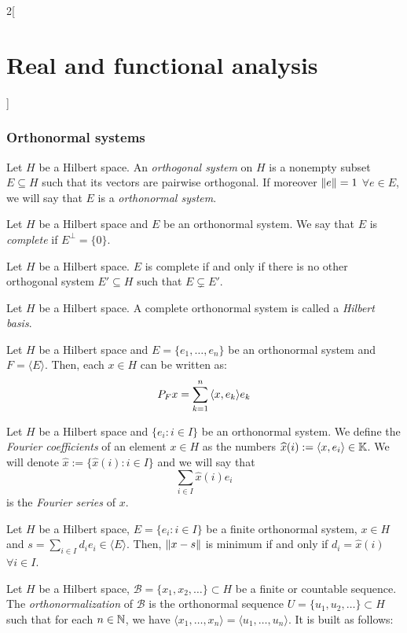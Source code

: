 \documentclass[../../../main_math.tex]{subfiles}
\begin{document}
\begin{multicols}{2}[\section{Real and functional analysis}]
  \subsubsection{Orthonormal systems}
  \begin{definition}
    Let $H$ be a Hilbert space. An \emph{orthogonal system} on $H$ is a nonempty subset $E\subseteq H$ such that its vectors are pairwise orthogonal. If moreover $\left\|e\right\|=1 $ $\forall e\in E$, we will say that $E$ is a \emph{orthonormal system}.
  \end{definition}
  \begin{definition}
    Let $H$ be a Hilbert space and $E$ be an orthonormal system. We say that $E$ is \emph{complete} if $E^\perp =\{0\}$.
  \end{definition}
  \begin{lemma}
    Let $H$ be a Hilbert space. $E$ is complete if and only if there is no other orthogonal system $E'\subseteq H$ such that $E\subsetneq E'$.
  \end{lemma}
  \begin{definition}
    Let $H$ be a Hilbert space. A complete orthonormal system is called a \emph{Hilbert basis}.
  \end{definition}
  \begin{lemma}
    Let $H$ be a Hilbert space and $E=\{e_1,\ldots,e_n\}$ be an orthonormal system and $F=\langle E\rangle$. Then, each $x\in H$ can be written as: $$P_Fx=\sum_{k=1}^n{\left\langle x,e_k\right\rangle}e_k$$
  \end{lemma}
  \begin{definition}
    Let $H$ be a Hilbert space and $\{e_i:i\in I\}$ be an orthonormal system. We define the \emph{Fourier coefficients} of an element $x\in H$ as the numbers $\widehat{x}(i):={\left\langle x,e_i\right\rangle}\in\mathbb{K}$. We will denote $\widehat{x}:=\{\widehat{x}(i):i\in I\}$ and we will say that $$\sum_{i\in I}\widehat{x}(i)e_i$$ is the \emph{Fourier series} of $x$.
  \end{definition}
  \begin{proposition}
    Let $H$ be a Hilbert space, $E=\{e_i:i\in I\}$ be a finite orthonormal system, $x\in H$ and $s=\sum_{i\in I}d_ie_i\in\langle E\rangle$. Then, $\left\|x-s\right\|$ is minimum if and only if $d_i=\widehat{x}(i)$ $\forall i\in I$.
  \end{proposition}
  \begin{proposition}
    Let $H$ be a Hilbert space, $\mathcal{B}=\{x_1,x_2,\ldots\}\subset H$ be a finite or countable sequence. The \emph{orthonormalization} of $\mathcal{B}$ is the orthonormal sequence $U=\{u_1,u_2,\ldots\}\subset H$ such that for each $n\in \mathbb{N}$, we have $\langle x_1,\dots,x_n\rangle = \langle u_1,\dots,u_n\rangle$. It is built as follows:

\end{proposition}
\end{multicols}
\end{document}
